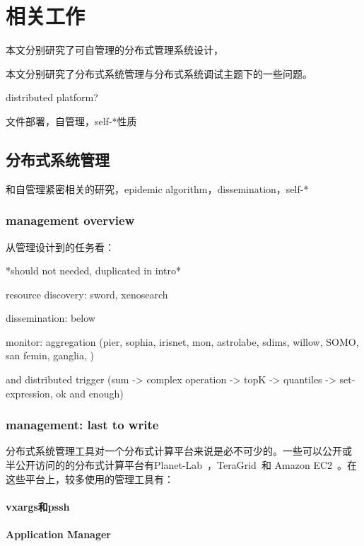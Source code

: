 \chapter{相关工作}
\label{chap:related}

本文分别研究了可自管理的分布式管理系统设计，

本文分别研究了分布式系统管理与分布式系统调试主题下的一些问题。

distributed platform?

文件部署，自管理，self-*性质


\section{分布式系统管理}

和自管理紧密相关的研究，epidemic algorithm，dissemination，self-*

\subsection{management overview}

从管理设计到的任务看：

*should not needed, duplicated in intro*

resource discovery: sword, xenosearch

dissemination: below

monitor: aggregation (pier, sophia, irisnet, mon, astrolabe, sdims,
willow, SOMO, san femin, ganglia, )

and distributed trigger (sum -> complex operation -> topK -> quantiles
-> set-expression, ok and enough)

\subsection{management: last to write}

分布式系统管理工具对一个分布式计算平台来说是必不可少的。一些可以公开或
半公开访问的的分布式计算平台有Planet-Lab~\cite{pl}，TeraGrid~\cite{tg}和
Amazon EC2~\cite{ec2}。在这些平台上，较多使用的管理工具有：

\subsubsection*{vxargs和pssh}

\subsubsection*{Application Manager}

